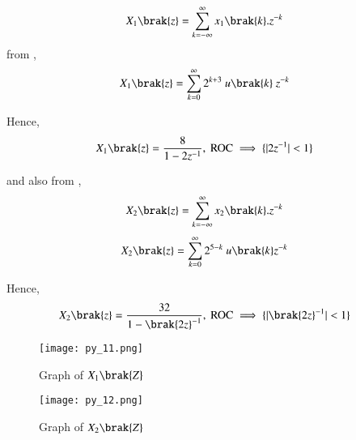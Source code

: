 \documentclass[beamer]{IEEEtran}
\theoremstyle{remark}
\begin{document}
\begin{align}
\label{a14}
    X_1\brak{z}&=\sum_{k=-\infty}^{\infty} x_1\brak{k}.z^{-k}
\end{align}
from \brak{\ref{a11}},
\begin{align}X_1\brak{z}&=\sum_{k=0}^{\infty}2^{k+3}\ u\brak{k}\ z^{-k}\end{align}

Hence,
\begin{align}
X_1\brak{z}&=\frac{8}{1-2z^{-1}},\ \text{ROC}\implies\{|2z^{-1}|<1\}
\end{align}

and also from \brak{\ref{a12}},\\
\begin{align}
    X_2\brak{z}&=\sum_{k=-\infty}^{\infty} x_2\brak{k}.z^{-k}
\end{align}
\begin{align}X_2\brak{z}&=\sum_{k=0}^{\infty} 2^{5-k}\ u\brak{k}z^{-k}\end{align}

Hence,
\begin{align}X_2\brak{z}&=\frac{32}{1-{\brak{2z}^{-1}}},\ \text{ROC}\implies\{|{\brak{2z}^{-1}}|<1\} \end{align}
\begin{figure}[h]
    \centering
    \texttt{[image: py\_11.png]}
    \label{$X_1(Z)$}
    \caption*{Graph of $X_1\brak{Z}$}
\end{figure}
\begin{figure}[h]
    \centering
    \texttt{[image: py\_12.png]}
    \label{$X_2(Z)$}
    \caption*{Graph of $X_2\brak{Z}$}
\end{figure}
\end{document}
